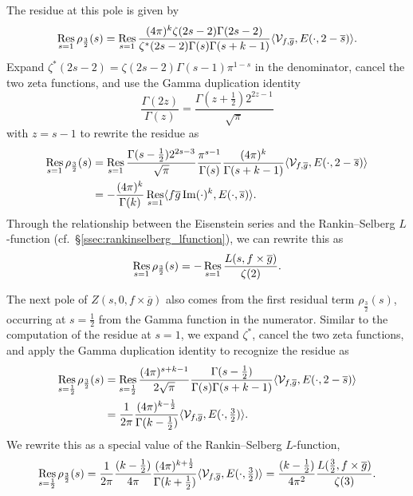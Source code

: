 The residue at this pole is given by
\begin{equation}\label{eq:Zresidue}
  \operatorname*{Res}_{s = 1} \rho_{\frac{3}{2}}(s) = \operatorname*{Res}_{s = 1} \frac{(4\pi)^k \zeta(2s - 2)\Gamma(2s
  - 2)}{\zeta^*(2s-2)\Gamma(s)\Gamma(s + k - 1)}\langle \mathcal{V}_{f,\overline{g} },
E(\cdot, 2-\overline{s})\rangle.
\end{equation}
Expand $\zeta^*(2s-2) = \zeta(2s-2) \Gamma(s-1) \pi^{1-s}$ in the denominator, cancel the
two zeta functions, and use the Gamma duplication identity
\begin{equation}
  \frac{\Gamma(2z)}{\Gamma(z)} = \frac{\Gamma(z + \tfrac{1}{2}) 2^{2z - 1}}{\sqrt \pi}
\end{equation}
with $z = s-1$ to rewrite the residue as
\begin{align}
  \operatorname*{Res}_{s = 1} \rho_{\frac{3}{2}}(s) &= \operatorname*{Res}_{s = 1} \frac{\Gamma(s - \tfrac{1}{2})
  2^{2s-3}}{\sqrt \pi} \frac{\pi^{s-1}}{\Gamma(s)} \frac{(4\pi)^k}{\Gamma(s + k - 1)}
  \langle \mathcal{V}_{f, \overline{g}}, E(\cdot, 2 - \overline{s}) \rangle \\
  &= -\frac{(4\pi)^k}{\Gamma(k)} \operatorname*{Res}_{s = 1} \langle f \overline{g} \operatorname{Im}(\cdot)^k,
E(\cdot, \overline{s})\rangle.
\end{align}
Through the relationship between the Eisenstein series and the
Rankin--Selberg $L$-function (cf.~\S\ref{ssec:rankinselberg_lfunction}), %
we can rewrite this as
\begin{equation}\label{eq:first_residual_pole_1}
  \operatorname*{Res}_{s = 1} \rho_{\frac{3}{2}}(s) = -\operatorname*{Res}_{s = 1} \frac{L(s, f\times
  \overline{g})}{\zeta(2)}.
\end{equation}


The next pole of $Z(s, 0, f\times \overline{g})$ also comes from the first residual term
$\rho_{\frac{3}{2}}(s)$, occurring at $s = \tfrac{1}{2}$ from the Gamma function in the
numerator.
Similar to the computation of the residue at $s = 1$, we expand $\zeta^*$, cancel the two
zeta functions, and apply the Gamma duplication identity to recognize the residue as
\begin{align}
  \operatorname*{Res}_{s = \frac{1}{2}} \rho_{\frac{3}{2}}(s) &= \operatorname*{Res}_{s = \frac{1}{2}} \frac{(4\pi)^{s +
  k - 1}}{2\sqrt \pi} \frac{\Gamma(s - \tfrac{1}{2})}{\Gamma(s) \Gamma(s + k - 1)} \langle
  \mathcal{V}_{f, \overline{g}}, E(\cdot, 2 - \overline{s}) \rangle \\
  &= \frac{1}{2 \pi }\frac{(4\pi)^{k - \frac{1}{2}}}{\Gamma(k - \frac{1}{2})}\langle
\mathcal{V}_{f,\overline{g} }, E(\cdot, \tfrac{3}{2}) \rangle.
\end{align}
We rewrite this as a special value of the Rankin--Selberg $L$-function, %
\begin{equation}\label{eq:first_residual_pole_half}
  \operatorname*{Res}_{s = \frac{1}{2}} \rho_{\frac{3}{2}}(s) = \frac{1}{2 \pi}\frac{(k -
  \frac{1}{2})}{4\pi} \frac{(4\pi)^{k + \frac{1}{2}}}{\Gamma(k + \frac{1}{2})}\langle
\mathcal{V}_{f,\overline{g} }, E(\cdot, \tfrac{3}{2}) \rangle = \frac{(k -
\frac{1}{2})}{4\pi^2} \frac{L(\frac{3}{2}, f\times \overline{g} )}{\zeta(3)}.
\end{equation}


